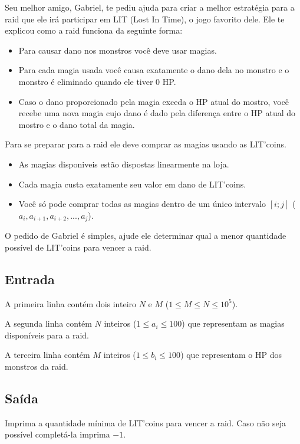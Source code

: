 Seu melhor amigo, Gabriel, te pediu ajuda para criar a melhor estratégia para a raid que ele irá participar em LIT (Lost In Time), o jogo favorito dele. Ele te explicou como a raid funciona da seguinte forma:

\begin{itemize}
    \item Para causar dano nos monstros você deve usar magias.
    \item Para cada magia usada você causa exatamente o dano dela no monstro e o monstro é eliminado quando ele tiver 0 HP.
    \item Caso o dano proporcionado pela magia exceda o HP atual do mostro, você recebe uma nova magia cujo dano é dado pela diferença entre o HP atual do mostro e o dano total da magia.
\end{itemize}

Para se preparar para a raid ele deve comprar as magias usando as LIT'coins.
\begin{itemize}
    \item As magias disponiveis estão dispostas linearmente na loja.
    \item Cada magia custa exatamente seu valor em dano de LIT'coins.
    \item Você só pode comprar todas as magias dentro de um único intervalo $[i; j]$ ($a_i, a_{i+1}, a_{i+2}, ..., a_j$).
\end{itemize}

O pedido de Gabriel é simples, ajude ele determinar qual a menor quantidade possível de LIT'coins para vencer a raid.

\subsection*{Entrada}
A primeira linha contém dois inteiro $N$ e $M$ ($1 \leq M \leq N \leq 10^5$).

A segunda linha contém $N$ inteiros ($1 \leq a_i \leq 100$) que representam as magias disponíveis para a raid.

A terceira linha contém $M$ inteiros ($1 \leq b_i \leq 100$) que representam o HP dos monstros da raid.

\subsection*{Saída}
Imprima a quantidade mínima de LIT'coins para vencer a raid. Caso não seja possível completá-la imprima $-1$.

